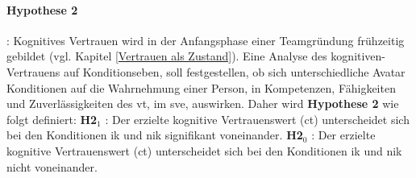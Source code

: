 \documentclass[a4paper,11pt]{article}%
\renewcommand{\\}{\vspace*{0.5\baselineskip} \newline}
\begin{document}




\paragraph{Hypothese 2}:
Kognitives Vertrauen wird in der Anfangsphase einer Teamgründung frühzeitig gebildet (vgl. Kapitel \ref{Vertrauen als Zustand}).
Eine Analyse des kognitiven-Vertrauens auf Konditionseben, soll festgestellen, ob sich unterschiedliche Avatar Konditionen auf die Wahrnehmung einer Person, in Kompetenzen, Fähigkeiten und Zuverlässigkeiten des \ac{vt}, im \ac{sve}, auswirken.
Daher wird \textbf{Hypothese 2} wie folgt definiert:\\
\textbf{H2$_{1}$} : Der erzielte kognitive Vertrauenswert (\ac{ct}) unterscheidet sich bei den Konditionen \ac{ik} und \ac{nik} signifikant voneinander. \newline
\textbf{H2$_{0}$} : Der erzielte kognitive Vertrauenswert (\ac{ct}) unterscheidet sich bei den Konditionen \ac{ik} und \ac{nik} nicht voneinander. \\
\end{document}
